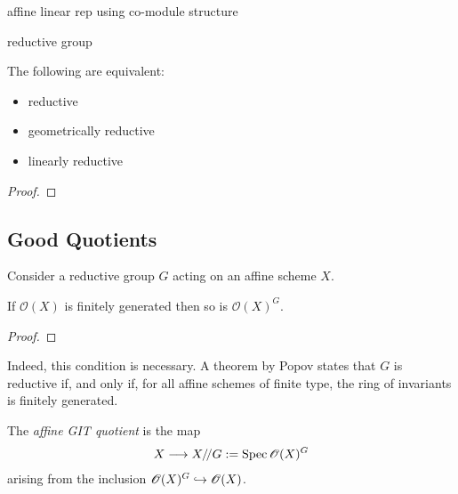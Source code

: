 \documentclass[12pt]{ociamthesis}  %
\begin{document}
\begin{example}
  affine linear rep using co-module structure
  \missingexample
\end{example}

\begin{definition}
  reductive group \missingdefinition
\end{definition}

\begin{theorem}
  The following are equivalent:
  \begin{itemize}
    \item reductive
    \item geometrically reductive
    \item linearly reductive
  \end{itemize}
  \begin{proof}
    \missingproof
  \end{proof}
\end{theorem}

\begin{example}
\end{example}

\missingsection

\subsection{Good Quotients}

Consider a reductive group $G$ acting on an affine scheme $X$.

\begin{theorem}[Nagata]
  If $\mathscr O(X)$ is finitely generated then so is $\mathscr O(X)^G$.
  \begin{proof}
    \missingproof
  \end{proof}
\end{theorem}

Indeed, this condition is necessary. A theorem by Popov \missingcitation
states that $G$ is reductive if, and only if, for all affine schemes of
finite type, the ring of invariants is finitely generated.

\begin{definition}
  The \emph{affine GIT quotient} is the map
  \begin{align*}
    X \longrightarrow X/\!/ G := \operatorname{Spec}\mathscr O(X)^G
  \end{align*}
  arising from the inclusion $\mathscr O(X)^G \hookrightarrow \mathscr O(X)$.
\end{definition}
\end{document}
